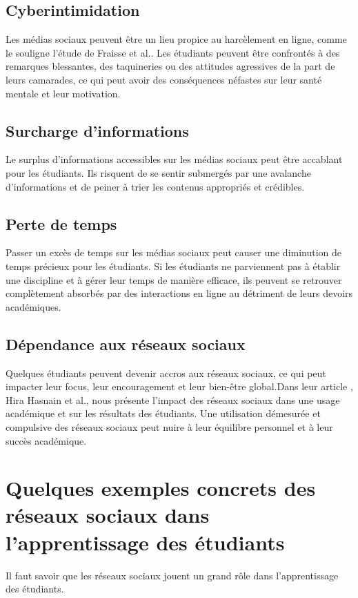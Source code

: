 \documentclass[12pt,a4paper,titlepage]{article}
\begin{document}
\subsection{Cyberintimidation } 
Les médias sociaux peuvent être un lieu propice au harcèlement en ligne, comme le souligne l'étude de Fraisse et al.\citep{fraisse2015stop}. Les étudiants peuvent être confrontés à des remarques blessantes, des taquineries ou des attitudes agressives de la part de leurs camarades, ce qui peut avoir des conséquences néfastes sur leur santé mentale et leur motivation.
\subsection{Surcharge d'informations} 
Le surplus d'informations accessibles sur les médias sociaux peut être accablant pour les étudiants. Ils risquent de se sentir submergés par une avalanche d'informations et de peiner à trier les contenus appropriés et crédibles.
\subsection{Perte de temps}
Passer un excès de temps sur les médias sociaux peut causer une diminution de temps précieux pour les étudiants. Si les étudiants ne parviennent pas à établir une discipline et à gérer leur temps de manière efficace, ils peuvent se retrouver complètement absorbés par des interactions en ligne au détriment de leurs devoirs académiques.




\subsection{Dépendance aux réseaux sociaux}
Quelques étudiants peuvent devenir accros aux réseaux sociaux, ce qui peut impacter leur focus, leur encouragement et leur bien-être global.Dans leur article \citep{hasnain2015impact}, Hira Hasnain et al., nous présente l'impact des réseaux sociaux dans une usage académique et sur les résultats des étudiants. Une utilisation démesurée et compulsive des réseaux sociaux peut nuire à leur équilibre personnel et à leur succès académique.



\section{Quelques exemples concrets des réseaux sociaux dans l’apprentissage des étudiants}
 Il faut savoir que les réseaux sociaux jouent un grand rôle dans l’apprentissage des étudiants.
\end{document}
